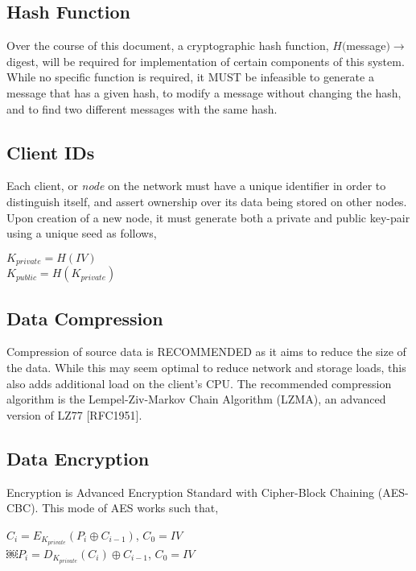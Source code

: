 \documentclass[journal]{IEEEtran}
\begin{document}
\subsection{Hash Function}
Over the course of this document, a cryptographic hash function, $H($message$) \rightarrow$ digest, will be required for implementation of certain components of this system. While no specific function is required, it MUST be infeasible to generate a message that has a given hash, to modify a message without changing the hash, and to find two different messages with the same hash.

\subsection{Client IDs}
Each client, or \textit{node} on the network must have a unique identifier in order to distinguish itself, and assert ownership over its data being stored on other nodes. Upon creation of a new node, it must generate both a private and public key-pair using a unique seed as follows,

\begin{center}
$K_{private} = H(IV)$\\
$K_{public} = H(K_{private})$
\end{center}



\subsection{Data Compression}
Compression of source data is RECOMMENDED as it aims to reduce the size of the data. While this may seem optimal to reduce network and storage loads, this also adds additional load on the client's CPU. The recommended compression algorithm is the Lempel-Ziv-Markov Chain Algorithm (LZMA), an advanced version of LZ77 [RFC1951].

\subsection{Data Encryption} %
Encryption is Advanced Encryption Standard with Cipher-Block Chaining (AES-CBC). This mode of AES works such that,

\begin{center}
$C_i = E_{K_{private}}(P_i \oplus{} C_{i-1})$, $C_0 = IV$\\
$￼P_i = D_{K_{private}}(C_i) \oplus{} C_{i-1}$, $C_0 = IV$
\end{center}
\end{document}

